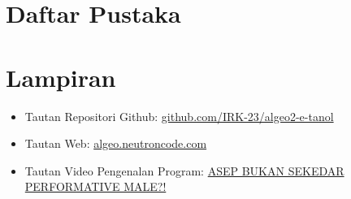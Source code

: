 \documentclass[12pt,a4paper]{article}
\begin{document}
\newpage

\section*{Daftar Pustaka}




\newpage
\section*{Lampiran}

\begin{itemize}
    \item Tautan Repositori Github: \href{https://github.com/IRK-23/algeo2-e-tanol}{github.com/IRK-23/algeo2-e-tanol}
    \item Tautan Web: \href{https://algeo2.neutroncodes.com/}{algeo.neutroncode.com}
    \item Tautan Video Pengenalan Program: \href{https://youtu.be/4O_Qmi1UCMI}{ASEP BUKAN SEKEDAR PERFORMATIVE MALE?!}
\end{itemize}
\end{document}
